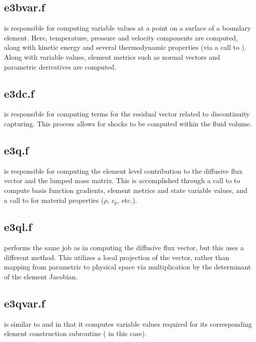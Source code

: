 \documentclass[./]{subfiles}
\begin{document}
\subsection{e3bvar.f} 
 is responsible for computing variable values at a point on a surface of a boundary element. Here, temperature, pressure and velocity components are computed, along with kinetic energy and several thermodynamic properties (via a call to ). Along with variable values, element metrics such as normal vectors and parametric derivatives are computed. 

\subsection{e3dc.f }
 is responsible for computing terms for the residual vector related to discontinuity capturing. This process allows for shocks to be computed within the fluid volume.

\subsection{e3q.f}	 
 is responsible for computing the element level contribution to the diffusive flux vector and the lumped mass matrix. This is accomplished through a call to  to compute basis function gradients, element metrics and state variable values, and a call to  for material properties ($\rho$, $c_p$, etc.).

\subsection{e3ql.f} 
 performs the same job as  in computing the diffusive flux vector, but this uses a different method. This utilizes a local projection of the vector, rather than mapping from parametric to physical space via multiplication by the determinant of the element Jacobian. 

\subsection{e3qvar.f }
 is similar to  and  in that it computes variable values required for its corresponding element construction subroutine ( in this case). 
\end{document}
